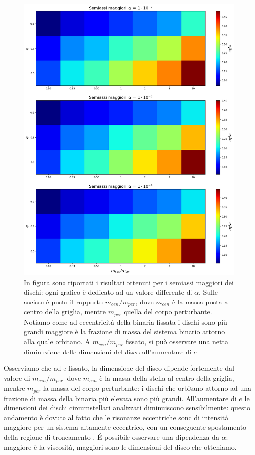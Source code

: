 \documentclass[12pt, a4paper]{report}
\begin{document}
\begin{figure}[H]
    \centering
    \includegraphics[width=\textwidth]{Immagini/graf_riass.png}
    \caption{In figura sono riportati i risultati ottenuti per i semiassi maggiori dei dischi: ogni grafico è dedicato ad un valore differente di $\alpha$. Sulle ascisse è posto il rapporto $m_{cen}/m_{per}$, dove $m_{cen}$ è la massa posta al centro della griglia, mentre $m_{per}$ quella del corpo perturbante. Notiamo come ad eccentricità della binaria fissata i dischi sono più grandi maggiore è la frazione di massa del sistema binario attorno alla quale orbitano. A $m_{cen}/m_{per}$ fissato, si può osservare una netta diminuzione delle dimensioni del disco all'aumentare di $e$.}
    \label{fig:sax_magg}
\end{figure}

Osserviamo che ad $e$ fissato, la dimensione del disco dipende fortemente dal valore di $m_{cen}/m_{per}$, dove $m_{cen}$ è la massa della stella al centro della griglia, mentre $m_{per}$ la massa del corpo perturbante: i dischi che orbitano attorno ad una frazione di massa della binaria più elevata sono più grandi.
All'aumentare di $e$ le dimensioni dei dischi circumstellari analizzati diminuiscono sensibilmente: questo andamento è dovuto al fatto che le risonanze eccentriche sono di intensità maggiore per un sistema altamente eccentrico, con un conseguente spostamento della regione di troncamento \parencite{ArtymowiczLubow1994}.
\'E possibile osservare una dipendenza da $\alpha$: maggiore è la viscosità, maggiori sono le dimensioni del disco che otteniamo.
\end{document}
